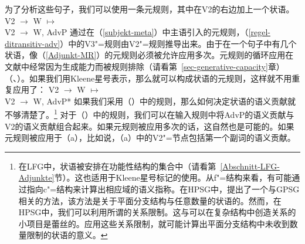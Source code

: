 \noindent
为了分析这些句子，我们可以使用一条元规则，其中在V2的右边加上一个状语\citep[]{Uszkoreit87a}。
\ea
\label{Adjunkt-MR}
V2  $\to$ W $\mapsto$\\
V2  $\to$ W, AdvP
\z 
通过在（\ref{subjekt-meta}）中主语引入的元规则，（\ref{regel-ditransitiv-adv}）中的V3"=规则由V2"=规则推导出来。由于在一个句子中有几个状语，像（\ref{Adjunkt-MR}）的元规则必须被允许应用多次。元规则的循环应用在文献中经常因为生成能力而被规则排除（请看第~\ref{sec-generative-capacity}章）（\citealp{Thompson82a-u}、\citealp[]{Uszkoreit87a}）。如果我们用Kleene星号\is{*}表示，那么就可以构成状语的元规则，这样就不用重复应用了\citep[]{Uszkoreit87a}：
\ea
\label{adv-metarule}
V2  $\to$ W $\mapsto$\\
V2  $\to$ W, AdvP*
\z 
如果我们采用（）中的规则，那么如何决定状语的语义贡献就不够清楚了。\footnote{
在LFG\indexlfg 中，状语被安排在功能性结构的集合中（请看第~\ref{Abschnitt-LFG-Adjunkte}节）。这也适用于Kleene星号标记的使用。从f"=结构来看，有可能通过指向c"=结构来计算出相应域的语义指称。在HPSG\indexhpsg 中，\citet{Kasper94a}提出了一个与GPSG相关的方法，该方法是关于平面分支结构与任意数量的状语的。然而，在HPSG中，我们可以利用所谓的关系限制。这与可以在复杂结构中创造关系的小项目是蕾丝的。应用这些关系限制，就可能计算出平面分支结构中未收到数量限制的状语的意义。
} 对于（）中的规则，我们可以在输入规则中将AdvP的语义贡献与V2的语义贡献组合起来。如果元规则被应用多次的话，这自然也是可能的。如果元规则被应用于（a），比如说，（a）中的V2"=节点包括第一个副词的语义贡献。
